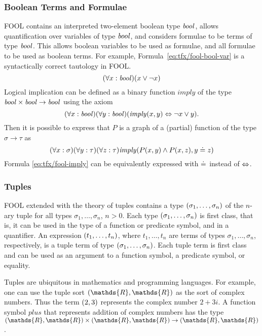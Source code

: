 \subsubsection{Boolean Terms and Formulae}

FOOL contains an interpreted two-element boolean type $\mathit{bool}$, allows 
quantification over variables of type $\mathit{bool}$, and considers formulae to 
be terms of type $\mathit{bool}$.
This allows boolean variables to be used as formulae, and all formulae to be 
used as boolean terms.
For example, Formula~\ref{eq:tfx/fool-bool-var} is a syntactically correct 
tautology in FOOL.
\begin{equation}\label{eq:tfx/fool-bool-var}
(\forall x:\mathit{bool})(x \lor \neg x)
\end{equation}
Logical implication can be defined as a binary function
$\mathit{imply}$ of the type $\mathit{bool} \times \mathit{bool} \to \mathit{bool}$ using the axiom
\begin{equation}\label{eq:tfx/fool-imply}
(\forall x:\mathit{bool})(\forall y:\mathit{bool})(\mathit{imply}(x,y) \Leftrightarrow \neg x \lor y).
\end{equation}
Then it is possible to express that $P$ is a graph of a (partial) function of 
the type $\sigma \to \tau$ as
\begin{equation}\label{eq:tfx/bool-arg-example}
(\forall x:\sigma)(\forall y:\tau)(\forall z:\tau)
\mathit{imply}(P(x,y) \land P(x,z), y \doteq z)
\end{equation}
Formula \ref{eq:tfx/fool-imply} can be equivalently expressed with $\doteq$ instead of
$\Leftrightarrow$.

\subsubsection{Tuples}
FOOL extended with the theory of tuples contains a type
$({\sigma_1,\ldots,\sigma_n})$ of the $n$-ary tuple for all types
$\sigma_1,\ldots,\sigma_n$, $n>0$. Each type
$({\sigma_1,\ldots,\sigma_n})$ is first class, that is, it can be
used in the type of a function or predicate symbol, and in a quantifier. 
An expression $({t_1,\ldots,t_n})$, where $t_1,\ldots,t_n$ are
terms of types $\sigma_1,\ldots,\sigma_n$, respectively, is a tuple term of 
type $({\sigma_1,\ldots,\sigma_n})$. 
Each tuple term is first class and can be used as an argument to a function 
symbol, a predicate symbol, or equality.

Tuples are ubiquitous in mathematics and programming languages. For example,
one can use the tuple sort $\tuple{\mathds{R},\mathds{R}}$ as the sort of
complex numbers. 
Thus the term $({2,3})$ represents the complex number $2+3i$. 
A function symbol $\mathit{plus}$ that represents addition of complex numbers 
has the type $\tuple{\mathds{R},\mathds{R}} \times 
\tuple{\mathds{R},\mathds{R}} \to \tuple{\mathds{R},\mathds{R}}$.

